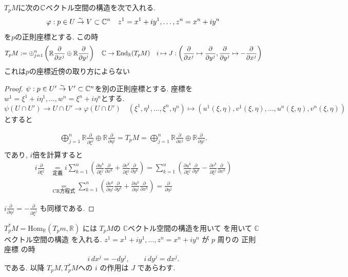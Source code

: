 ${T}_{p}M$に次の$\mathbb{C}$ベクトル空間の構造を次で入れる. 
$$
\varphi : p \in U \overset{\sim}{\to} V \subset \mathbb{C}^n \quad 
z^{1}=x^1 +iy^1, \ldots, z^n=x^n +iy^n
$$
を$p$の正則座標とする.
この時
$$
{T}_{p} M:= \oplus_{j=1}^{n}\left( \mathbb{R} \frac{\partial}{\partial x^j} \oplus  \mathbb{R} \frac{\partial}{\partial y^j} \right)
\quad 
\mathbb{C} \to \mathrm{End}_{\mathbb{R}}(T_p M)
\quad i \mapsto J : \left( \frac{\partial}{\partial x^j} \mapsto \frac{\partial}{\partial y^j}, \frac{\partial}{\partial y^j} \mapsto -\frac{\partial}{\partial x^j}\right)
$$
これは$p$の座標近傍の取り方によらない
\begin{proof}
$\psi : p \in U' \overset{\sim}{\to} V' \subset \mathbb{C}^n $を別の正則座標とする.
座標を$w^1=\xi^1+ i \eta^1, \ldots, w^n=\xi^n+ i \eta^n$とする.
$$
\psi(U \cap U') \to U \cap U' \to \varphi(U\cap U')
\quad 
(\xi^1,  \eta^1, \ldots, \xi^n, \eta^n) \mapsto (u^1(\xi, \eta), v^1(\xi, \eta), \ldots, u^n(\xi, \eta), v^n(\xi, \eta))
$$
とすると

\begin{align*}
\bigoplus_{j=1}^{n}\mathbb{R}\frac{\partial}{\partial \xi^j}
\oplus \mathbb{R}\frac{\partial}{\partial \eta^j}
=
T_p M
=
\bigoplus_{j=1}^{n}\mathbb{R}\frac{\partial}{\partial x^j}
\oplus \mathbb{R}\frac{\partial}{\partial y^j}.
\\
\end{align*}
であり, $i$倍を計算すると
\begin{align*}
i\frac{\partial}{\partial \xi^j}
&\underset{\text{定義}}{=}
i\sum_{k=1}^{n}
\left(
\frac{\partial u^k}{\partial \xi^j}\frac{\partial}{\partial x^k}
+
\frac{\partial v^k}{\partial \xi^j}\frac{\partial}{\partial y^k}
\right)
=
\sum_{k=1}^{n}
\left(
\frac{\partial u^k}{\partial \xi^j}\frac{\partial}{\partial y^k}
-
\frac{\partial v^k}{\partial \xi^j}\frac{\partial}{\partial x^k}
\right)
\\
&
\underset{\mathrm{CR}\text{方程式}}{=}
\sum_{k=1}^{n}
\left(
\frac{\partial v^k}{\partial \eta^j}\frac{\partial}{\partial y^k}
+
\frac{\partial u^k}{\partial \eta^j}\frac{\partial}{\partial x^k}
\right)
=
\frac{\partial}{\partial \eta^j}
\end{align*}

$
i\frac{\partial}{\partial \eta^j}
=
-\frac{\partial}{\partial \xi^j}
$
も同様である. 
\end{proof}


$T_p^*M=\mathrm{Hom}_{\mathbb{R}}(T_pm,\mathbb{R})$ には $T_pM$の \(\mathbb{C}\)ベクトル空間の構造を用いて
を用いて \(\mathbb{C}\) ベクトル空間の構造 を入れる.
\(z^1=x^1+i y^1,\ldots,z^n=x^n+i y^n\) が \(p\) 周りの 正則座標
の時
\[
i\,dx^j=-dy^j,
\qquad
i\,dy^j=dx^j.
\]
である. 
以降
$T_pM,T_p^*M$への \(i\) の作用は \(J\) であらわす.

